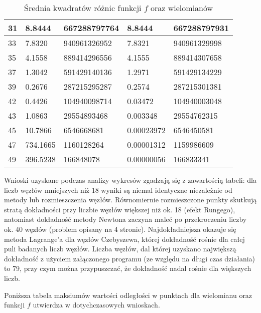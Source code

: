 \documentclass{article}
\begin{document}
\begin{table}[H]
\begin{tabular}{|l|ll|ll|}
    31& \multicolumn{1}{l|}{8.8444}  & 667288797764  & \multicolumn{1}{l|}{8.8444}  & 667288797931  \\ \hline
    33& \multicolumn{1}{l|}{7.8320}  & 940961326952 & \multicolumn{1}{l|}{7.8321}  &  940961329998 \\ \hline
    35& \multicolumn{1}{l|}{4.1558}  &  889414296556 & \multicolumn{1}{l|}{4.1555}  &  889414307658 \\ \hline
    37& \multicolumn{1}{l|}{1.3042}  & 591429140136  & \multicolumn{1}{l|}{1.2971}  &  591429134229 \\ \hline
    39& \multicolumn{1}{l|}{0.2676}  &  287215295287 & \multicolumn{1}{l|}{0.2574}  &  287215301381 \\ \hline
    42& \multicolumn{1}{l|}{0.4426}  & 104940098714  & \multicolumn{1}{l|}{0.03472}  &  104940003048 \\ \hline
    43& \multicolumn{1}{l|}{1.0863}  &  29554893468 & \multicolumn{1}{l|}{0.003348}  & 29554762315  \\ \hline
    45& \multicolumn{1}{l|}{10.7866}  & 6546668681  & \multicolumn{1}{l|}{0.00023972}  &  6546450581 \\ \hline
    47& \multicolumn{1}{l|}{734.1665}  & 1160128264  & \multicolumn{1}{l|}{0.00001312}  &  1159986609 \\ \hline
    49& \multicolumn{1}{l|}{396.5238}  & 166848078  & \multicolumn{1}{l|}{0.00000056}  &  166833341 \\ \hline
    \end{tabular}
    \caption{Średnia kwadratów różnic funkcji $f$ oraz wielomianów}
\end{table}

Wnioski uzyskane podczas analizy wykresów zgadzają się z zawartością tabeli: dla liczb węzłów mniejszych niż 18 wyniki są niemal identyczne
niezależnie od metody lub rozmieszczenia węzłów. Równomiernie rozmieszczone punkty skutkują stratą dokładności przy liczbie 
węzłów większej niż ok. 18 (efekt Rungego), natomiast dokładność metody Newtona zaczyna maleć
po przekroczeniu liczby ok. 40 węzłów (problem opisany na 4 stronie). Najdokładniejsza okazuje się metoda Lagrange'a dla węzłów
Czebyszewa, której dokładność rośnie dla całej puli badanych liczb węzłów. Liczba węzłów, dal której uzyskano największą
dokładność z użyciem załączonego programu (ze względu na długi czas działania) to 79, przy czym można przypuszczać, że dokładność nadal rośnie dla większych liczb.

Poniższa tabela maksiumów wartości odległości w punktach dla wielomianu oraz funkcji $f$ utwierdza w dotychczasowych wnioskach.
\end{document}
